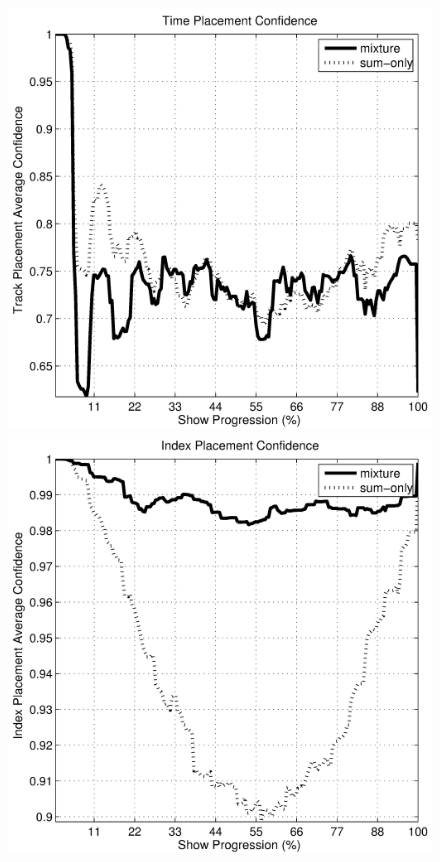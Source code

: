 \documentclass[twocolumn]{article}
\begin{document}
\begin{figure}
	
	\centering
	\includegraphics[scale=0.4]{images//timeplacementconfidence}
	\bigskip
	
	\includegraphics[scale=0.4]{images//indexplacementconfidence}
	\bigskip
	

\end{figure}
\end{document}
